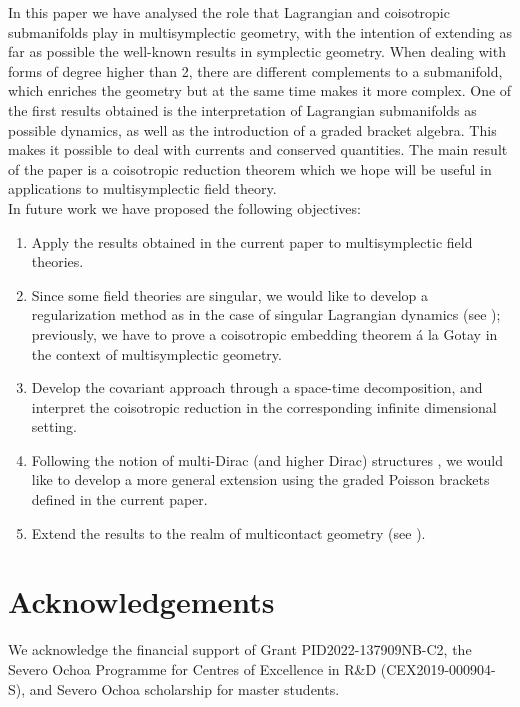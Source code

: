 In this paper we have analysed the role that Lagrangian and coisotropic submanifolds play in multisymplectic geometry, with the intention of extending as far as possible the well-known results in symplectic geometry. When dealing with forms of degree higher than 2, there are different complements to a submanifold, which enriches the geometry but at the same time makes it more complex. One of the first results obtained is the interpretation of Lagrangian submanifolds as possible dynamics, as well as the introduction of a graded bracket algebra. This makes it possible to deal with currents and conserved quantities. The main result of the paper is a coisotropic reduction theorem which we hope will be useful in applications to multisymplectic field theory.\\

In future work we have proposed the following objectives:

\begin{enumerate}

\item Apply the results obtained in the current paper to multisymplectic field theories.

\item Since some field theories are singular, we would like to develop a regularization method as in the case of singular Lagrangian dynamics (see \cite{ibort-marin}); previously, we have to prove a coisotropic embedding theorem \'a la Gotay \cite{gotay,zambon} in the context of multisymplectic geometry.

\item  Develop the covariant approach through a space-time decomposition, and interpret the coisotropic reduction in the corresponding infinite dimensional setting.

\item Following the notion of multi-Dirac (and higher Dirac) structures \cite{joris_MultiDirac1,jorisDirac2, ZambonDirac, BursztynDirac}, we would like to develop a more general extension using the graded Poisson brackets defined in the current paper.

\item Extend the results to the realm of multicontact geometry (see \cite{multicontacto}).

\end{enumerate}

\section*{Acknowledgements}

We acknowledge the financial support of Grant PID2022-137909NB-C2, the Severo Ochoa Programme for Centres of Excellence in R\&D (CEX2019-000904-S), and Severo Ochoa scholarship for master students. 